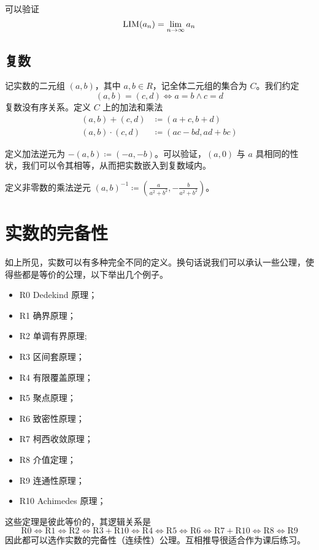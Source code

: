 可以验证
$$\operatorname{{LIM}}(a_n) = \lim_{n\to \infty} a_n$$

\subsection{复数}

记实数的二元组 $(a,b)$，其中 $a,b\in R$，记全体二元组的集合为 $C$。我们约定
\[(a,b) = (c,d) \Leftrightarrow a=b \land  c=d\]
复数没有序关系。定义 $C$ 上的加法和乘法
\[\begin{aligned}
		(a,b) + (c,d)     & \coloneqq  (a+c,b+d)     \\
		(a,b) \cdot (c,d) & \coloneqq  (ac-bd,ad+bc)
	\end{aligned}\]

定义加法逆元为 $-(a,b) \coloneqq  (-a,-b)$。可以验证，$(a,0)$ 与 $a$ 具相同的性状，我们可以令其相等，从而把实数嵌入到复数域内。

定义非零数的乘法逆元 $(a,b)^{-1} \coloneqq  \left(\frac{a}{a^2+b^2},-\frac{b}{a^2+b^2}\right)$。

\section{实数的完备性}

如上所见，实数可以有多种完全不同的定义。换句话说我们可以承认一些公理，使得些都是等价的公理，以下举出几个例子。

\begin{itemize}
	\item R0 Dedekind 原理；
	\item R1 确界原理；
	\item R2 单调有界原理;
	\item R3 区间套原理；
	\item R4 有限覆盖原理；
	\item R5 聚点原理；
	\item R6 致密性原理；
	\item R7 柯西收敛原理；
	\item R8 介值定理；
	\item R9 连通性原理；
	\item R10 Achimedes 原理；
\end{itemize}

这些定理是彼此等价的，其逻辑关系是
\[ \mathrm{R0} \Leftrightarrow \mathrm{R1} \Leftrightarrow\mathrm{R2} \Leftrightarrow\mathrm{R3} + \mathrm{R10} \Leftrightarrow\mathrm{R4} \Leftrightarrow\mathrm{R5} \Leftrightarrow\mathrm{R6} \Leftrightarrow\mathrm{R7}+\mathrm{R10} \Leftrightarrow\mathrm{R8} \Leftrightarrow\text{R9}  \]
因此都可以选作实数的完备性（连续性）公理。互相推导很适合作为课后练习。


